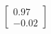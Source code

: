 \documentclass[preview]{standalone}
\begin{document}
\begin{align*}
\begin{bmatrix} 0.97 \\ -0.02 \end{bmatrix}
\end{align*}
\end{document}
